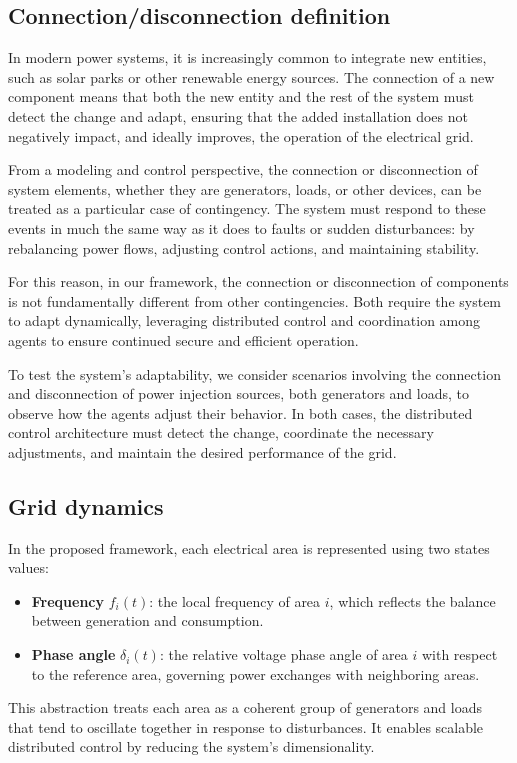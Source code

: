 \documentclass{article}
\begin{document}
\subsection{Connection/disconnection definition}
In modern power systems, it is increasingly common to integrate new entities, such as solar parks or other renewable energy sources. The connection of a new component means that both the new entity and the rest of the system must detect the change and adapt, ensuring that the added installation does not negatively impact, and ideally improves, the operation of the electrical grid.

From a modeling and control perspective, the connection or disconnection of system elements, whether they are generators, loads, or other devices, can be treated as a particular case of contingency. The system must respond to these events in much the same way as it does to faults or sudden disturbances: by rebalancing power flows, adjusting control actions, and maintaining stability.

For this reason, in our framework, the connection or disconnection of components is not fundamentally different from other contingencies. Both require the system to adapt dynamically, leveraging distributed control and coordination among agents to ensure continued secure and efficient operation.

To test the system's adaptability, we consider scenarios involving the connection and disconnection of power injection sources, both generators and loads, to observe how the agents adjust their behavior. In both cases, the distributed control architecture must detect the change, coordinate the necessary adjustments, and maintain the desired performance of the grid.

\subsection{Grid dynamics}
In the proposed framework, each electrical area is represented using two states values:
\begin{itemize}
    \item \textbf{Frequency} $f_i(t)$: the local frequency of area $i$, which reflects the balance between generation and consumption.
    \item \textbf{Phase angle} $\delta_i(t)$: the relative voltage phase angle of area $i$ with respect to the reference area, governing power exchanges with neighboring areas.
\end{itemize}
This abstraction treats each area as a coherent group of generators and loads that tend to oscillate together in response to disturbances. It enables scalable distributed control by reducing the system's dimensionality.
\end{document}
